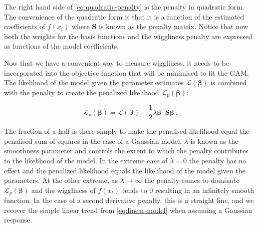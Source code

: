 \documentclass[12pt,]{article}
\begin{document}
The right hand side of \eqref{eq:quadratic-penalty} is the penalty in
quadratic form. The convenience of the quadratic form is that it is a
function of the estimated coefficients of \(f(x_t)\) where
\(\mathbf{S}\) is known as the penalty matrix. Notice that now both the
weights for the basis functions and the wiggliness penalty are expressed
as functions of the model coefficients.

Now that we have a convenient way to measure wiggliness, it needs to be
incorporated into the objective function that will be minimised to fit
the GAM. The likelihood of the model given the parameter estimates
\(\mathcal{L}(\boldsymbol{\beta})\) is combined with the penalty to
create the penalized likelihood \(\mathcal{L}_p(\boldsymbol{\beta})\):

\begin{equation*}
\mathcal{L}_p(\boldsymbol{\beta}) = \mathcal{L}(\boldsymbol{\beta}) - \frac{1}{2} \lambda\boldsymbol{\beta}^{\mathsf{T}}\mathbf{S}\boldsymbol{\beta}\, .
\end{equation*}

The fraction of a half is there simply to make the penalised likelihood
equal the penalised sum of squares in the case of a Gaussian model.
\(\lambda\) is known as the smoothness parameter and controls the extent
to which the penalty contributes to the likelihood of the model. In the
extreme case of \(\lambda = 0\) the penalty has no effect and the
penalized likelihood equals the likelihood of the model given the
parameters. At the other extreme, as \(\lambda \rightarrow \infty\) the
penalty comes to dominate \(\mathcal{L}_p(\boldsymbol{\beta})\) and the
wiggliness of \(f(x_t)\) tends to \(0\) resulting in an infinitely
smooth function. In the case of a second derivative penalty, this is a
straight line, and we recover the simple linear trend from
\eqref{eq:linear-model} when assuming a Gaussian response.
\end{document}
